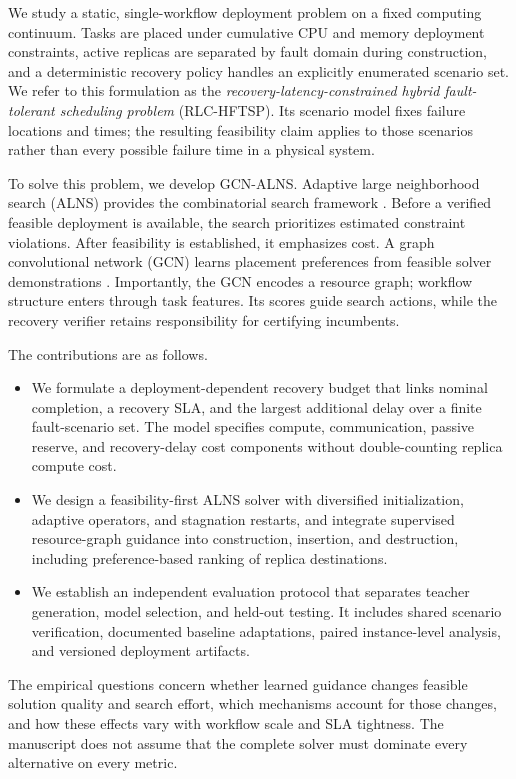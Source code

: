 We study a static, single-workflow deployment problem on a fixed computing
continuum. Tasks are placed under cumulative CPU and memory deployment
constraints, active replicas are separated by fault domain during
construction, and a deterministic recovery policy handles an explicitly
enumerated scenario set. We refer to this formulation as the
\emph{recovery-latency-constrained hybrid fault-tolerant scheduling problem}
(RLC-HFTSP). Its scenario model fixes failure locations and times; the
resulting feasibility claim applies to those scenarios rather than every
possible failure time in a physical system.

To solve this problem, we develop GCN-ALNS. Adaptive large neighborhood search
(ALNS) provides the combinatorial search framework
\cite{ropke2006alns,pisinger2007general}. Before a verified feasible deployment
is available, the search prioritizes estimated constraint violations. After
feasibility is established, it emphasizes cost. A graph convolutional network
(GCN) learns placement preferences from feasible solver demonstrations
\cite{kipf2017gcn}. Importantly, the GCN encodes a resource graph; workflow
structure enters through task features. Its scores guide search actions, while
the recovery verifier retains responsibility for certifying incumbents.

The contributions are as follows.
\begin{itemize}
  \item We formulate a deployment-dependent recovery budget that links nominal
  completion, a recovery SLA, and the largest additional delay over a finite
  fault-scenario set. The model specifies compute, communication, passive
  reserve, and recovery-delay cost components without double-counting replica
  compute cost.
  \item We design a feasibility-first ALNS solver with diversified
  initialization, adaptive operators, and stagnation restarts, and integrate
  supervised resource-graph guidance into construction, insertion, and
  destruction, including preference-based ranking of replica destinations.
  \item We establish an independent evaluation protocol that separates
  teacher generation, model selection, and held-out testing. It includes
  shared scenario verification, documented baseline adaptations, paired
  instance-level analysis, and versioned deployment artifacts.
\end{itemize}

The empirical questions concern whether learned guidance changes feasible
solution quality and search effort, which mechanisms account for those
changes, and how these effects vary with workflow scale and SLA tightness.
The manuscript does not assume that the complete solver must dominate every
alternative on every metric.

